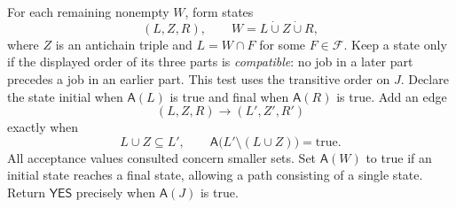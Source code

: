 \documentclass[11pt]{article}
\numberwithin{equation}{section}
\theoremstyle{definition}
\theoremstyle{remark}
\newcommand{\F}{\mathcal F}
\newcommand{\A}{\mathsf A}
\newcommand{\dotcup}{\mathbin{\dot\cup}}
\newcommand{\YES}{\mathsf{YES}}
\begin{document}
For each remaining nonempty \(W\), form states
\[
 (L,Z,R),\qquad W=L\dotcup Z\dotcup R,
\]
where \(Z\) is an antichain triple and \(L=W\cap F\) for some \(F\in\F\).
Keep a state only if the displayed order of its three parts is
\emph{compatible}: no job in a later part precedes a job in an earlier
part. This test uses the transitive order on \(J\).
Declare the state initial when \(\A(L)\) is true and final when
\(\A(R)\) is true. Add an edge
\[
 (L,Z,R)\longrightarrow(L',Z',R')
\]
exactly when
\begin{equation}
 L\cup Z\subseteq L',
 \qquad
 \A\bigl(L'\setminus(L\cup Z)\bigr)=\mathrm{true}.
 \label{eq:transition}
\end{equation}
All acceptance values consulted concern smaller sets.
Set \(\A(W)\) to true if an initial state reaches a final state,
allowing a path consisting of a single state.
Return \(\YES\) precisely when \(\A(J)\) is true.
\end{document}
